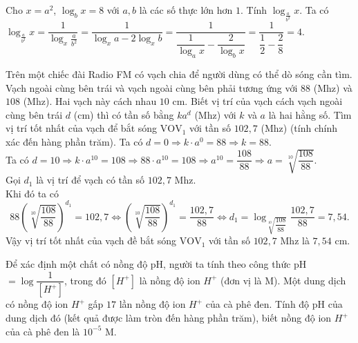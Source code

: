 \begin{bt}%
Cho $x=a^2$, $\log _b x = 8$ với $a, b$ là các số thực lớn hơn $1$. Tính $\log_{\frac{a}{b^2}} x$.
\loigiai
{
Ta có $\log_{\frac{a}{b^2}} x=\dfrac{1}{\log_x \frac{a}{b^2}}=\dfrac{1}{\log_x a-2\log_x b}=\dfrac{1}{\dfrac{1}{\log_a x}-\dfrac{2}{\log_b x}}=\dfrac{1}{\dfrac{1}{2}-\dfrac{2}{8}}=4$.
}
\end{bt}

\begin{bt}%

Trên một chiếc đài Radio FM có vạch chia để người dùng có thể dò sóng cần tìm. Vạch ngoài cùng bên trái và vạch ngoài cùng bên phải tương ứng với $88$ (Mhz) và $108$ (Mhz). Hai vạch này cách nhau $10$ cm. Biết vị trí của vạch cách vạch ngoài cùng bên trái $d$ (cm) thì có tần số bằng $ka^d$ (Mhz) với $k$ và $a$ là hai hằng số. Tìm vị trí tốt nhất của vạch để bắt sóng $\mathrm{VOV}_1$ với tần số $102{,}7$ (Mhz) (tính chính xác đến hàng phần trăm).
\loigiai
{
Ta có	$d=0 \Rightarrow k\cdot a^0=88 \Rightarrow k=88$. \\
Ta có $d=10 \Rightarrow k\cdot a^{10}=108 \Rightarrow 88\cdot a^{10}=108 \Rightarrow a^{10}=\dfrac{108}{88} \Rightarrow a=\sqrt[10]{\dfrac{108}{88}}$.\\
Gọi $d_1$ là vị trí để vạch có tần số $102{,}7$ Mhz. \\
Khi đó ta có
$$88\left(\sqrt[10]{\dfrac{108}{88}}\right)^{d_1}=102{,}7 \Leftrightarrow\left(\sqrt[10]{\dfrac{108}{88}}\right)^{d_1}=\dfrac{102{,}7}{88} \Leftrightarrow d_1=\log _{\sqrt[10]{\dfrac{108}{88}}} \dfrac{102{,}7}{88}=7{,}54.$$
Vậy vị trí tốt nhất của vạch đề bắt sóng $\mathrm{VOV}_1$ với tần số $102{,}7$ Mhz là $7{,}54$ cm.		
}
\end{bt}

\begin{bt}%

	Để xác định một chất có nồng độ pH, người ta tính theo công thức pH$=\log\dfrac{1}{\left[H^+\right]}$, trong đó $\left[H^+\right]$ là nồng độ ion $H^+$ (đơn vị là M). Một dung dịch có nồng độ ion $H^+$ gấp $17$ lần nồng độ ion $H^+$ của cà phê đen. Tính độ pH của dung dịch đó (kết quả được làm tròn đến hàng phần trăm), biết nồng độ ion $H^+$ của cà phê đen là $10^{-5}$ M.
\end{bt}

